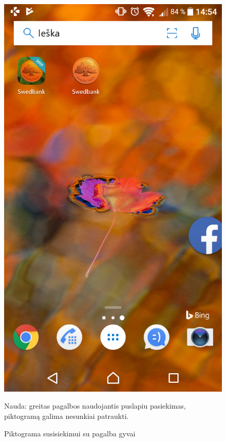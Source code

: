 \documentclass{VUMIFPSkursinis}
\begin{document}
\begin{figure}[!htb]
	\begin{center}
	\includegraphics[scale=0.2]{pagalbaGyvai.png}
	\end{center}
  \caption{Piktograma susisiekimui su pagalba gyvai}
	\label{fig:pagalbaGyvai}
	Nauda: greitas pagalbos naudojantis puslapiu pasiekimas, piktogramą galima nesunkiai patraukti.
\end{figure}
\end{document}

